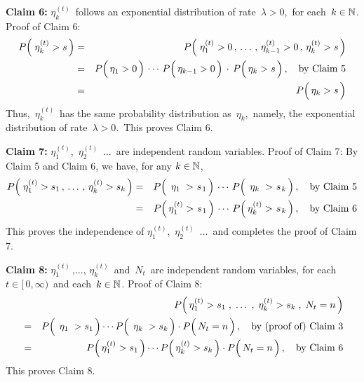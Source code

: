 \vskip 0.5cm
\noindent
\textbf{Claim 6:}\quad
$\eta^{(t)}_{k}$\, follows an exponential distribution of rate \,$\lambda > 0$,\,
for each \,$k \in \mathbb{N}$.
\vskip 0.2cm
\noindent
Proof of Claim 6:\quad
\begin{eqnarray*}
P\!\left(\;\eta^{(t)}_{k} > s \,\right)
&=&
	P\!\left(\;\eta^{(t)}_{1} > 0 \,,\, \ldots \,,\, \eta^{(t)}_{k-1} > 0 \,,\, \eta^{(t)}_{k} > s \,\right)
\\
&=&
	P\!\left(\,\eta_{1} \overset{{\color{white}.}}{>} 0\,\right)
	\,\cdots\,
	P\!\left(\,\eta_{k-1} \overset{{\color{white}.}}{>} 0\,\right)
	\,\cdot\,
	P\!\left(\,\eta_{k} \overset{{\color{white}.}}{>} s\,\right),
	\quad
	\textnormal{by Claim 5}
\\
&=&
	P\!\left(\,\eta_{k} \overset{{\color{white}.}}{>} s\,\right)
\end{eqnarray*}
Thus, \,$\eta^{(t)}_{k}$\, has the same probability distribution as \,$\eta_{k}$,\,
namely, the exponential distribution of rate \,$\lambda > 0$.\,
This proves Claim 6.

\vskip 0.5cm
\noindent
\textbf{Claim 7:}\quad
$\eta^{(t)}_{1}$,\, $\eta^{(t)}_{2}$\, $\ldots$\, are independent random variables.
\vskip 0.2cm
\noindent
Proof of Claim 7:\quad
By Claim 5 and Claim 6, we have, for any $k \in \mathbb{N}$,
\begin{eqnarray*}
P\!\left(\;\eta^{(t)}_{1} > s_{1} \,,\, \ldots \,,\, \eta^{(t)}_{k} > s_{k} \,\right)
&=&
	P\!\left(\,{\color{white}.} \eta_{1} {\color{white}.} > \overset{{\color{white}-}}{s}_{1}\,\right)
	\,\cdots\,
	P\!\left(\,{\color{white}.} \eta_{k} {\color{white}.} > \overset{{\color{white}-}}{s}_{k}\,\right),
	\quad
	\textnormal{by Claim 5}
\\
&=&
	P\!\left(\,\eta^{(t)}_{1} > \overset{{\color{white}-}}{s}_{1}\,\right)
	\,\cdots\,
	P\!\left(\,\eta^{(t)}_{k} > \overset{{\color{white}-}}{s}_{k}\,\right),
	\quad
	\textnormal{by Claim 6}
\end{eqnarray*}
This proves the independence of
$\eta^{(t)}_{1}$,\, $\eta^{(t)}_{2}$\, $\ldots$\,
and completes the proof of Claim 7.

\vskip 0.5cm
\noindent
\textbf{Claim 8:}\quad
$\eta^{(t)}_{1}$\,,\;$\ldots$\;, $\eta^{(t)}_{k}$\, and \,$N_{t}$\, are independent random variables,
for each \,$t \in [\,0,\infty)$\, and each \,$k \in \mathbb{N}$.
\vskip 0.2cm
\noindent
Proof of Claim 8:\quad
\begin{eqnarray*}
&&
	P\!\left(\,\eta^{(t)}_{1} > s_{1} \;,\; \ldots \;,\; \eta^{(t)}_{k} > s_{k} \;,\; N_{t} = n\,\right)
\\
&=&
	P\!\left(\,{\color{white}.}\eta_{1}{\color{white}.} \overset{{\color{white}.}}{>} s_{1}\,\right)
	\cdots
	P\!\left(\,{\color{white}.}\eta_{k}{\color{white}.} \overset{{\color{white}.}}{>} s_{k}\,\right)
	\cdot
	P\!\left(\,N_{t} \overset{{\color{white}-}}{=} n \,\right),
	\quad
	\textnormal{by (proof of) Claim 3}
\\
&=&
	P\!\left(\,\eta^{(t)}_{1} \overset{{\color{white}.}}{>} s_{1}\,\right)
	\cdots
	P\!\left(\,
		\eta^{(t)}_{k} \overset{{\color{white}.}}{>} s_{k}
		\,\right)
	\cdot
	P\!\left(\,N_{t} \overset{{\color{white}-}}{=} n \,\right),
	\quad
	\textnormal{by Claim 6}
\end{eqnarray*}
This proves Claim 8.

